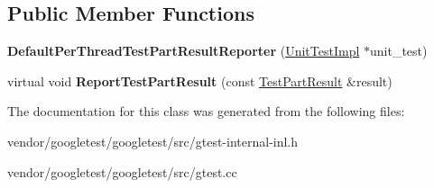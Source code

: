 \subsection*{Public Member Functions}
\begin{DoxyCompactItemize}
\item 
\mbox{\label{classtesting_1_1internal_1_1_default_per_thread_test_part_result_reporter_a968a846e5a90d2ffea8b2ce2746099bd}} 
{\bfseries Default\+Per\+Thread\+Test\+Part\+Result\+Reporter} (\hyperlink{classtesting_1_1internal_1_1_unit_test_impl}{Unit\+Test\+Impl} $\ast$unit\+\_\+test)
\item 
\mbox{\label{classtesting_1_1internal_1_1_default_per_thread_test_part_result_reporter_ac6dc08eadc4e5a2a64a91d0b6c6b3aad}} 
virtual void {\bfseries Report\+Test\+Part\+Result} (const \hyperlink{classtesting_1_1_test_part_result}{Test\+Part\+Result} \&result)
\end{DoxyCompactItemize}


The documentation for this class was generated from the following files\+:\begin{DoxyCompactItemize}
\item 
vendor/googletest/googletest/src/gtest-\/internal-\/inl.\+h\item 
vendor/googletest/googletest/src/gtest.\+cc\end{DoxyCompactItemize}
